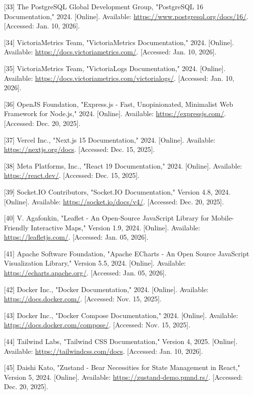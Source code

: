 \documentclass[a4paper]{extarticle}
\begin{document}
{[}33{]} The PostgreSQL Global Development Group, "PostgreSQL 16
Documentation," 2024. {[}Online{]}. Available:
\url{https://www.postgresql.org/docs/16/}. {[}Accessed: Jan. 10,
2026{]}.

{[}34{]} VictoriaMetrics Team, "VictoriaMetrics Documentation," 2024.
{[}Online{]}. Available: \url{https://docs.victoriametrics.com/}.
{[}Accessed: Jan. 10, 2026{]}.

{[}35{]} VictoriaMetrics Team, "VictoriaLogs Documentation," 2024.
{[}Online{]}. Available:
\url{https://docs.victoriametrics.com/victorialogs/}. {[}Accessed: Jan.
10, 2026{]}.

{[}36{]} OpenJS Foundation, "Express.js - Fast, Unopinionated,
Minimalist Web Framework for Node.js," 2024. {[}Online{]}. Available:
\url{https://expressjs.com/}. {[}Accessed: Dec. 20, 2025{]}.

{[}37{]} Vercel Inc., "Next.js 15 Documentation," 2024. {[}Online{]}.
Available: \url{https://nextjs.org/docs}. {[}Accessed: Dec. 15, 2025{]}.

{[}38{]} Meta Platforms, Inc., "React 19 Documentation," 2024.
{[}Online{]}. Available: \url{https://react.dev/}. {[}Accessed: Dec. 15,
2025{]}.

{[}39{]} Socket.IO Contributors, "Socket.IO Documentation," Version 4.8,
2024. {[}Online{]}. Available: \url{https://socket.io/docs/v4/}.
{[}Accessed: Dec. 20, 2025{]}.

{[}40{]} V. Agafonkin, "Leaflet - An Open-Source JavaScript Library for
Mobile-Friendly Interactive Maps," Version 1.9, 2024. {[}Online{]}.
Available: \url{https://leafletjs.com/}. {[}Accessed: Jan. 05, 2026{]}.

{[}41{]} Apache Software Foundation, "Apache ECharts - An Open Source
JavaScript Visualization Library," Version 5.5, 2024. {[}Online{]}.
Available: \url{https://echarts.apache.org/}. {[}Accessed: Jan. 05,
2026{]}.

{[}42{]} Docker Inc., "Docker Documentation," 2024. {[}Online{]}.
Available: \url{https://docs.docker.com/}. {[}Accessed: Nov. 15,
2025{]}.

{[}43{]} Docker Inc., "Docker Compose Documentation," 2024.
{[}Online{]}. Available: \url{https://docs.docker.com/compose/}.
{[}Accessed: Nov. 15, 2025{]}.

{[}44{]} Tailwind Labs, "Tailwind CSS Documentation," Version 4, 2025.
{[}Online{]}. Available: \url{https://tailwindcss.com/docs}.
{[}Accessed: Jan. 10, 2026{]}.

{[}45{]} Daishi Kato, "Zustand - Bear Necessities for State Management
in React," Version 5, 2024. {[}Online{]}. Available:
\url{https://zustand-demo.pmnd.rs/}. {[}Accessed: Dec. 20, 2025{]}.
\end{document}
